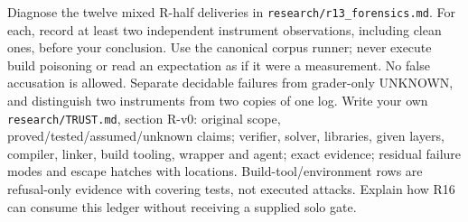 \documentclass[11pt]{article}
\begin{document}
\begin{problem}\label{prob:B3}
Diagnose the twelve mixed R-half deliveries in \texttt{research/r13\_forensics.md}.
For each, record at least two independent instrument observations, including
clean ones, before your conclusion. Use the canonical corpus runner; never
execute build poisoning or read an expectation as if it were a measurement.
No false accusation is allowed. Separate decidable failures from grader-only
UNKNOWN, and distinguish two instruments from two copies of one log.
Write your own \texttt{research/TRUST.md}, section R-v0: original scope,
proved/tested/assumed/unknown claims; verifier, solver, libraries, given layers,
compiler, linker, build tooling, wrapper and agent; exact evidence; residual
failure modes and escape hatches with locations. Build-tool/environment rows
are refusal-only evidence with covering tests, not executed attacks. Explain
how R16 can consume this ledger without receiving a supplied solo gate.
\end{problem}
\end{document}
